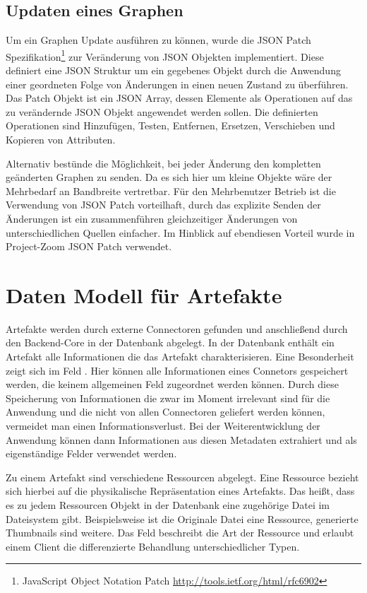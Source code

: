 \subsection{Updaten eines Graphen}

Um ein Graphen Update ausführen zu können, wurde die JSON Patch Spezifikation\footnote{JavaScript Object Notation Patch \url{http://tools.ietf.org/html/rfc6902}} zur Veränderung von JSON Objekten implementiert. Diese definiert eine JSON Struktur um ein gegebenes Objekt durch die Anwendung einer geordneten Folge von Änderungen in einen neuen Zustand zu überführen. Das Patch Objekt ist ein JSON Array, dessen Elemente als Operationen auf das zu verändernde JSON Objekt angewendet werden sollen. Die definierten Operationen sind Hinzufügen, Testen, Entfernen, Ersetzen, Verschieben und Kopieren von Attributen.

Alternativ bestünde die Möglichkeit, bei jeder Änderung den kompletten geänderten Graphen zu senden. Da es sich hier um kleine Objekte wäre der Mehrbedarf an Bandbreite vertretbar. Für den Mehrbenutzer Betrieb ist die Verwendung von JSON Patch vorteilhaft, durch das explizite Senden der Änderungen ist ein zusammenführen gleichzeitiger Änderungen von unterschiedlichen Quellen einfacher. Im Hinblick auf ebendiesen Vorteil wurde in Project-Zoom JSON Patch verwendet.

\section{Daten Modell für Artefakte}

Artefakte werden durch externe Connectoren gefunden und anschließend durch den Backend-Core in der Datenbank abgelegt. In der Datenbank enthält ein Artefakt alle Informationen die das Artefakt charakterisieren. Eine Besonderheit zeigt sich im Feld . Hier können alle Informationen eines Connetors gespeichert werden, die keinem allgemeinen Feld zugeordnet werden können. Durch diese Speicherung von Informationen die zwar im Moment irrelevant sind für die Anwendung und die nicht von allen Connectoren geliefert werden können, vermeidet man einen Informationsverlust. Bei der Weiterentwicklung der Anwendung können dann Informationen aus diesen Metadaten extrahiert und als eigenständige Felder verwendet werden. 

Zu einem Artefakt sind verschiedene Ressourcen abgelegt. Eine Ressource bezieht sich hierbei auf die physikalische Repräsentation eines Artefakts. Das heißt, dass es zu jedem Ressourcen Objekt in der Datenbank eine zugehörige Datei im Dateisystem gibt. Beispielsweise ist die Originale Datei eine Ressource, generierte Thumbnails sind weitere. Das Feld  beschreibt die Art der Ressource und erlaubt einem Client die differenzierte Behandlung unterschiedlicher Typen.  

